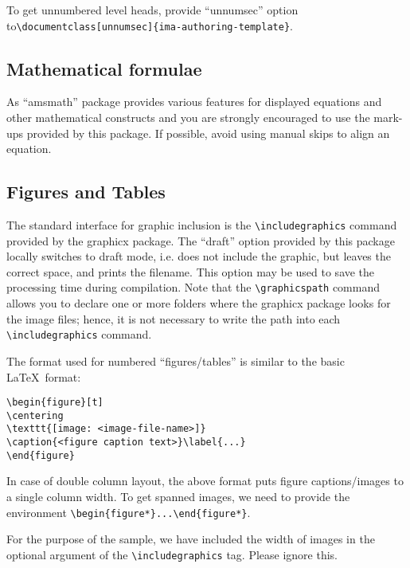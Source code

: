 \documentclass{article}
\begin{document}
\medskip

\noindent To get unnumbered level heads, provide ``unnumsec'' option to\newline \verb+\documentclass[unnumsec]{ima-authoring-template}+.

\subsection{Mathematical formulae}

As ``amsmath'' package provides various features for displayed equations and other mathematical constructs and you are strongly encouraged to use the mark-ups provided by this package. If possible, avoid using manual skips to align an equation.

\subsection{Figures and Tables}
The standard interface for graphic inclusion is the \verb+\includegraphics+ command provided by the graphicx  package. The ``draft'' option provided by this package locally switches to draft mode, i.e. does not include the graphic, but leaves the correct space, and prints the filename. This option may be used to save the processing time during compilation. Note that the \verb+\graphicspath+ command allows you to declare one or more folders where the graphicx package looks for the image files; hence, it is not necessary to write the path into each \verb+\includegraphics+ command.\pagebreak

The format used for numbered ``figures/tables'' is similar to the basic \LaTeX\ format:

\begin{verbatim}
\begin{figure}[t]
\centering
\texttt{[image: <image-file-name>]}
\caption{<figure caption text>}\label{...}
\end{figure}
\end{verbatim}

In case of double column layout, the above format puts figure captions/images to a single column width. To get spanned images, we need to provide the environment
\verb+\begin{figure*}...\end{figure*}+.

For the purpose of the sample, we have included the width of images in the optional argument of the \verb+\includegraphics+ tag. Please ignore this.
\end{document}
